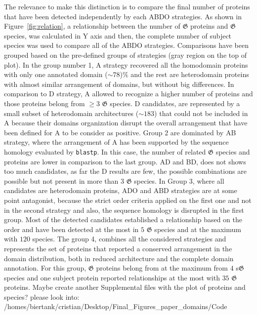 \documentclass[11pt]{article}
\newcommand{\TODO}[1]{\begingroup\color{red}#1\endgroup}
\begin{document}
The relevance to make this distinction is to compare the final number of proteins
that have been detected independently by each ABDO strategies. As shown in Figure~\ref{fig:relation}, 
a relationship between the number of $\boldsymbol{\mathfrak{G}}$ proteins 
and $\boldsymbol{\mathfrak{G}}$ species, was calculated in Y axis and then, the complete number
of subject species was used to compare all of the ABDO strategies. Comparisons have been grouped
based on the pre-defined groups of strategies (gray region on the top of plot). In the
group number 1, A strategy recovered all the homodomain proteins with only one annotated domain 
($\sim 78$)\% and the rest are heterodomain proteins with almost similar arrangement of domains,
but without big differences. In comparison to D strategy, A allowed to recognize a higher 
number of proteins and those proteins belong from $\geq 3$ $\boldsymbol{\mathfrak{G}}$ species. D
candidates, are represented by a small subset of heterodomain architectures ($\sim 183$) that
could not be included in A because their domains organization disrupt the overall arrangement
that have been defined for A to be consider as positive. Group $2$ are dominated by AB strategy,
where the arrangement of A has been supported by the sequence homology evaluated by \texttt{blastp}.
In this case, the number of related $\boldsymbol{\mathfrak{G}}$ species and proteins are lower in
comparison to the last group. AD and BD, does not shows too much candidates, as far the D results 
are few, the possible combinations are possible but not present in more than $3$ 
$\boldsymbol{\mathfrak{G}}$ species. In Group $3$, where all candidates are heterodomain proteins,
ADO and ABD strategies are at some point antagonist, because the strict order 
criteria applied on the first one and not in the second strategy and also, the sequence 
homology is disrupted in the first group. Most of the detected candidates established 
a relationship based on the order and have been detected at the most in $5$ 
$\boldsymbol{\mathfrak{G}}$ species and at the maximum with $120$ species. The group 4, combines
all the considered strategies and represents the set of proteins that reported a
conserved arrangement in the domain distribution, both in reduced architecture and the
complete domain annotation. For this group, $\boldsymbol{\mathfrak{G}}$ proteins belong from 
at the maximum from $4$ s$\boldsymbol{\mathfrak{G}}$ species and one subject protein 
reported relationships at the most with $35$ $\boldsymbol{\mathfrak{G}}$ proteins.
\TODO{Maybe create another Supplemental files with the plot of proteins and species?
please look into: /homes/biertank/cristian/Desktop/Final\_Figures\_paper\_domains/Code}
\end{document}
